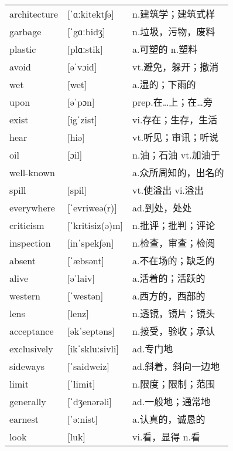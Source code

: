 \documentclass[a4paper]{article}
\begin{document}
\section{}
\begin{tabular}{l l l}

architecture & [ˈɑːkitekt∫ə] & n.建筑学；建筑式样 \\
garbage & [ˈgɑːbidʒ] & n.垃圾，污物，废料 \\
plastic & [plɑːstik] & a.可塑的 n.塑料 \\
avoid & [əˈvɔid] & vt.避免，躲开；撤消 \\
wet & [wet] & a.湿的；下雨的 \\
upon & [əˈpɔn] & prep.在…上；在…旁 \\
exist & [igˈzist] & vi.存在；生存，生活 \\
hear & [hiə] & vt.听见；审讯；听说 \\
oil & [ɔil] & n.油；石油 vt.加油于 \\
well-known &  & a.众所周知的，出名的 \\
spill & [spil] & vt.使溢出 vi.溢出 \\
everywhere & [ˈevriweə(r)] & ad.到处，处处 \\
criticism & [ˈkritisiz(ə)m] & n.批评；批判；评论 \\
inspection & [inˈspek∫ən] & n.检查，审查；检阅 \\
absent & [ˈæbsənt] & a.不在场的；缺乏的 \\
alive & [əˈlaiv] & a.活着的；活跃的 \\
western & [ˈwestən] & a.西方的，西部的 \\
lens & [lenz] & n.透镜，镜片；镜头 \\
acceptance & [əkˈseptəns] & n.接受，验收；承认 \\
exclusively & [ikˈskluːsivli] & ad.专门地 \\
sideways & [ˈsaidweiz] & ad.斜着，斜向一边地 \\
limit & [ˈlimit] & n.限度；限制；范围 \\
generally & [ˈdʒenərəli] & ad.一般地；通常地 \\
earnest & [ˈəːnist] & a.认真的，诚恳的 \\
look & [luk] & vi.看，显得 n.看 \\

\end{tabular}
\end{document}
